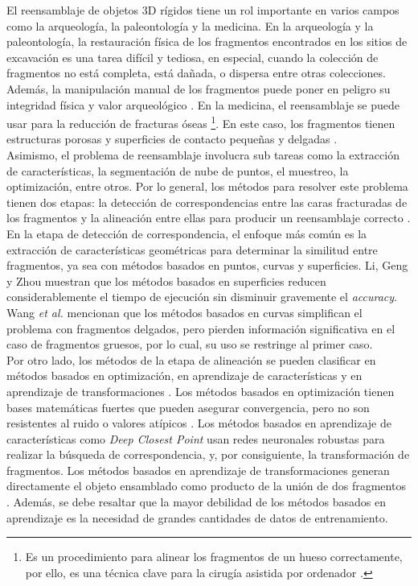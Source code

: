 El reensamblaje de objetos 3D rígidos tiene un rol importante en varios campos como la arqueología, la paleontología y la medicina. En la arqueología y la paleontología, la restauración física de los fragmentos encontrados en los sitios de excavación es una tarea difícil y tediosa, en especial, cuando la colección de fragmentos no está completa, está dañada, o dispersa entre otras colecciones. Además, la manipulación manual de los fragmentos puede poner en peligro su integridad física y valor arqueológico \cite{1}. En la medicina, el reensamblaje se puede usar para la reducción de fracturas óseas \footnote{Es un procedimiento para alinear los fragmentos de un hueso correctamente, por ello, es una técnica clave para la cirugía asistida por ordenador \cite{fn1}.}. En este caso, los fragmentos tienen estructuras porosas y superficies de contacto pequeñas y delgadas \cite{5}. \\

Asimismo, el problema de reensamblaje involucra sub tareas como la extracción de características, la segmentación de nube de puntos, el muestreo, la optimización, entre otros. Por lo general, los métodos para resolver este problema tienen dos etapas: la detección de correspondencias entre las caras fracturadas de los fragmentos y la alineación entre ellas para producir un reensamblaje correcto \cite{2}. \\

En la etapa de detección de correspondencia, el enfoque más común es la extracción de características geométricas para determinar la similitud entre fragmentos, ya sea con métodos basados en puntos, curvas y superficies. Li, Geng y Zhou  \cite{3} muestran que los métodos basados en superficies reducen considerablemente el tiempo de ejecución sin disminuir gravemente el \textit{accuracy}. Wang \textit{et al.} \cite{7} mencionan que los métodos basados en curvas simplifican el problema con fragmentos delgados, pero pierden información significativa en el caso de fragmentos gruesos, por lo cual, su uso se restringe al primer caso. \\

Por otro lado, los métodos de la etapa de alineación se pueden clasificar en métodos basados en optimización, en aprendizaje de características y en aprendizaje de transformaciones \cite{9}. Los métodos basados en optimización tienen bases matemáticas fuertes que pueden asegurar convergencia, pero no son resistentes al ruido o valores atípicos \cite{8}. Los métodos basados en aprendizaje de características como \textit{Deep Closest Point} \cite{11} usan redes neuronales robustas para realizar la búsqueda de correspondencia, y, por consiguiente, la transformación de fragmentos. Los métodos basados en aprendizaje de transformaciones generan directamente el objeto ensamblado como producto de la unión de dos fragmentos \cite{10}. Además, se debe resaltar que la mayor debilidad de los métodos basados en aprendizaje es la necesidad de grandes cantidades de datos de entrenamiento. \\

